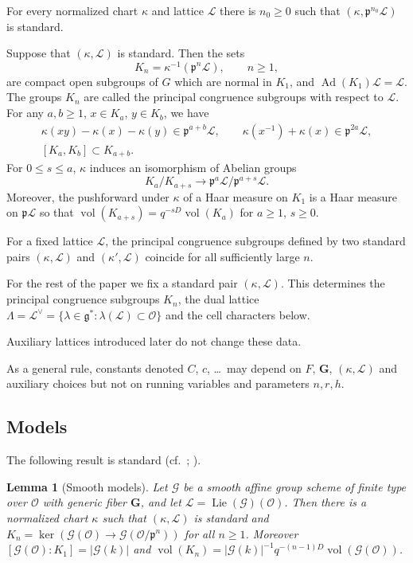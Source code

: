 \documentclass[11pt,reqno]{amsart}
\numberwithin{equation}{section}
\theoremstyle{plain}
\newtheorem{lemma}[theorem]{Lemma}
\theoremstyle{definition}
\theoremstyle{remark}
\theoremstyle{plain}
\newcommand{\OO}{\mathcal{O}}    %
\newcommand{\pp}{\mathfrak{p}}   %
\newcommand{\Lat}{\mathcal{L}}   %
\newcommand{\dLat}{\Lambda}      %
\newcommand{\bG}{\mathbf{G}}     %
\newcommand{\g}{\mathfrak{g}}    %
\newcommand{\gd}{\mathfrak{g}^*} %
\newcommand{\cG}{\mathcal{G}}                   %
\newcommand{\abs}[1]{\lvert#1\rvert}
\DeclareMathOperator{\vol}{vol}
\DeclareMathOperator{\Ad}{Ad}
\DeclareMathOperator{\Lie}{Lie}
\newcommand{\lf}{\lambda}
\newcommand{\nchart}{normalized chart}
\begin{document}
For every \nchart{} $\kappa$ and lattice $\Lat$ there is $n_0\ge0$ such that $(\kappa,\pp^{n_0}\Lat)$ is standard.

Suppose that $(\kappa,\Lat)$ is standard. Then the sets
\begin{equation}\label{eq:tower}
K_n=\kappa^{-1}(\pp^n\Lat),\qquad n\ge1,
\end{equation}
are compact open subgroups of $G$ which are normal in $K_1$, and $\Ad(K_1)\Lat=\Lat$.
The groups $K_n$ are called the principal congruence subgroups with respect to $\Lat$.
For any $a,b\ge 1$, $x\in K_a$, $y\in K_b$, we have
\begin{subequations}
\begin{gather}
\kappa(xy)-\kappa(x)-\kappa(y)\in\pp^{a+b}\Lat,\qquad
\kappa(x^{-1})+\kappa(x)\in\pp^{2a}\Lat,\label{eq:law}\\
[K_a,K_b]\subset K_{a+b}.\label{eq:commutator}
\end{gather}
\end{subequations}
For $0\le s\le a$, $\kappa$ induces an isomorphism of Abelian groups
\[
K_a/K_{a+s}\rightarrow\pp^a\Lat/\pp^{a+s}\Lat.
\]
Moreover, the pushforward under $\kappa$ of a Haar measure on $K_1$ is a Haar measure on $\pp\Lat$ so that
$\vol(K_{a+s})=q^{-sD}\vol(K_a)$ for $a\ge1$, $s\ge0$.

For a fixed lattice $\Lat$, the principal congruence subgroups defined
by two standard pairs $(\kappa,\Lat)$ and $(\kappa',\Lat)$ coincide for all sufficiently large $n$.

For the rest of the paper we fix a standard pair $(\kappa,\Lat)$.
This determines the principal congruence subgroups $K_n$, the dual lattice
$\dLat=\Lat^\vee=\{\lf\in\gd:\lf(\Lat)\subset\OO\}$ and the cell characters below.

Auxiliary lattices introduced later do not change these data.

As a general rule, constants denoted $C$, $c$, \dots\ may depend on $F$, $\bG$, $(\kappa,\Lat)$ and
auxiliary choices but not on running variables and parameters $n,r,h$.


\subsection{Models}\label{sec:models}

The following result is standard  (cf.~\cite[Part~II, Chapter~IV, \S8]{MR2179691}; \cite[Definition~A.5.12, Lemma~A.5.13]{MR4520154}).

\begin{lemma}[Smooth models]\label{lem:model}
Let $\cG$ be a smooth affine group scheme of finite type over
$\OO$ with generic fiber $\bG$, and let $\Lat=\Lie(\cG)(\OO)$.
Then there is a \nchart{} $\kappa$ such that $(\kappa,\Lat)$ is standard
and $K_n=\ker(\cG(\OO)\to\cG(\OO/\pp^n))$ for all
$n\ge1$. Moreover $[\cG(\OO):K_1]=\abs{\cG(k)}$ and
$\vol(K_n)=\abs{\cG(k)}^{-1}q^{-(n-1)D}\vol(\cG(\OO))$.
\end{lemma}
\end{document}
